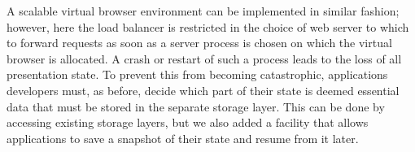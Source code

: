 A scalable virtual browser environment can be implemented in similar fashion;
however, here the load balancer is restricted in the choice of web server to 
which to forward requests as soon as a server process is chosen on which the
virtual browser is allocated.  A crash or restart of such a process leads
to the loss of all presentation state.  To prevent this from becoming 
catastrophic, applications developers must, as before, decide which part of their
state is deemed essential data that must be stored in the separate storage
layer.  This can be done by accessing existing storage layers,
but we also added a facility that allows applications to save a snapshot
of their state and resume from it later.


